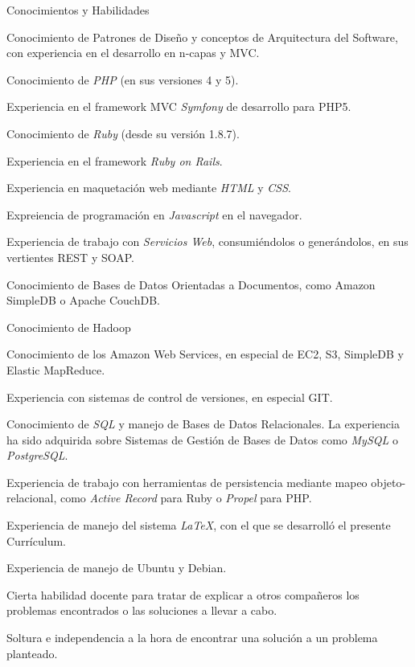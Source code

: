 \begin{rubric}{Conocimientos y Habilidades}


  \entry*
  Conocimiento de Patrones de Diseño y conceptos de Arquitectura del Software, con experiencia en el desarrollo en n-capas y MVC.

  \entry*
  Conocimiento de \emph{PHP} (en sus versiones 4 y 5).

  \entry*
  Experiencia en el framework MVC \textit{Symfony} de desarrollo para PHP5.

  \entry*
  Conocimiento de \emph{Ruby} (desde su versión 1.8.7).

  \entry*
  Experiencia en el framework \textit{Ruby on Rails}.

  \entry*
  Experiencia en maquetación web mediante \emph{HTML} y \emph{CSS}.

  \entry*
  Expreiencia de programación en \emph{Javascript} en el navegador.

  \entry*
  Experiencia de trabajo con \emph{Servicios Web}, consumiéndolos o generándolos, en sus vertientes REST y SOAP.

  \entry*
  Conocimiento de Bases de Datos Orientadas a Documentos, como Amazon SimpleDB o Apache CouchDB.

  \entry*
  Conocimiento de Hadoop

  \entry*
  Conocimiento de los Amazon Web Services, en especial de EC2, S3, SimpleDB y Elastic Map\-Reduce.

  \entry*
  Experiencia con sistemas de control de versiones, en especial GIT.

  \entry*
  Conocimiento de \emph{SQL} y manejo de Bases de Datos Relacionales. La experiencia ha sido adquirida sobre Sistemas de Gestión de Bases de Datos como \emph{MySQL} o \emph{PostgreSQL}.

  \entry*
  Experiencia de trabajo con herramientas de persistencia mediante mapeo objeto-relacional, como \emph{Active Record} para Ruby o \emph{Propel} para PHP.

  \entry*
  Experiencia de manejo del sistema \emph{LaTeX}, con el que se desarrolló el presente Currículum.

  \entry*
  Experiencia de manejo de Ubuntu y Debian.


  \entry*
  Cierta habilidad docente para tratar de explicar a otros compañeros los problemas encontrados o las soluciones a llevar a cabo.

  \entry*
  Soltura e independencia a la hora de encontrar una solución a un problema planteado.

\end{rubric}
